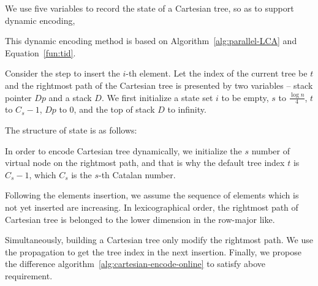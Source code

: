 



We use five variables to record the state of a Cartesian tree, so as
to support dynamic encoding,

This dynamic encoding method is based on
Algorithm~\ref{alg:parallel-LCA} and Equation~\ref{fun:tid}.

Consider the step to insert the $i$-th element.  Let the index of the
current tree be $t$ and the rightmost path of the Cartesian tree is
presented by two variables -- stack pointer $Dp$ and a stack $D$.  We
first initialize a state set $i$ to be empty, $s$ to $\frac{\log
  n}{4}$, ${t}$ to $C_s - 1$, $Dp$ to 0, and the top of stack $D$ to
infinity.

The structure of state is as follows:

\iffalse
我們定義轉移狀態由 5 個變數來決定動態笛卡爾樹的編碼，當前插入第 $i$ 個
元素，最終填充 $s$ 個元素，當前的樹編號 $\mathit{tid}$，以及笛卡爾樹的
右鏈狀態指針 $Dp$ 與其堆疊 $D$，其結構如下：
\fi







In order to encode Cartesian tree dynamically, we initialize the $s$
number of virtual node on the rightmost path, and that is why the
default tree index ${\mathit t}$ is $C_s - 1$, which $C_s$ is the
$s$-th Catalan number.

Following the elements insertion, we assume the sequence of elements
which is not yet inserted are increasing.  In lexicographical order,
the rightmost path of Cartesian tree is belonged to the lower
dimension in the row-major like.

Simultaneously, building a Cartesian tree only modify the rightmost
path.  We use the propagation to get the tree index in the next
insertion.  Finally, we propose the difference
algorithm~\ref{alg:cartesian-encode-online} to satisfy above
requirement.

